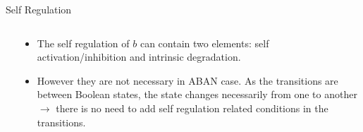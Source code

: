 \begin{frame}[noframenumbering]{Self Regulation}
\begin{columns}
    \begin{column}{0.4\textwidth}
        
    \end{column}
    \begin{column}{0.6\textwidth}
        
        \begin{itemize}
            \item The self regulation of $b$ can contain two elements: self activation/inhibition and intrinsic degradation. 
            \item However they are not necessary in ABAN case.
        As the transitions are between Boolean states, the state changes necessarily from one to another $\to$ there is no need to add self regulation related conditions in the transitions.
        \end{itemize}
    \end{column}
\end{columns}
    
\end{frame}